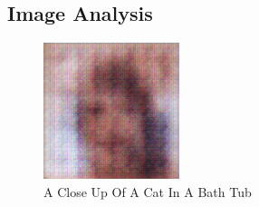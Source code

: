 \documentclass{article}%
\begin{document}
%
\subsection{Image Analysis}%
\label{subsec:ImageAnalysis}%


\begin{figure}[h!]%
\centering%
\includegraphics[width=150px]{500_fake_images/samples_5_381.png}%
\caption{A Close Up Of A Cat In A Bath Tub}%
\end{figure}

%
\end{document}
